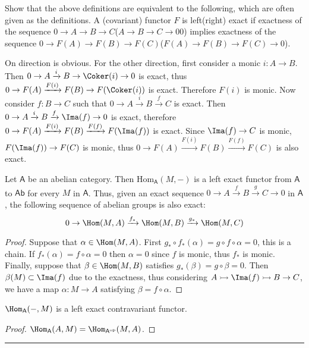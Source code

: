 \begin{exer} Show that the above definitions are equivalent to the following, which are often given as the definitions. A (covariant) functor $F$ is left(right) exact if exactness of the sequence $0\rightarrow A\rightarrow B\rightarrow C$($A\rightarrow B\rightarrow C\rightarrow0 0$) implies exactness of the sequence $0\rightarrow F(A)\rightarrow F(B)\rightarrow F(C)$($F(A)\rightarrow F(B)\rightarrow F(C)\rightarrow 0$).
\end{exer}
\begin{solution} On direction is obvious. For the other direction, first consider a monic $i:A\rightarrow B$. Then $0\rightarrow A\xrightarrow{i} B\rightarrow \Coker(i)\rightarrow 0$ is exact, thus $0\rightarrow F(A)\xrightarrow{F(i)} F(B)\rightarrow F(\Coker(i))$ is exact. Therefore $F(i)$ is monic. Now consider $f:B\rightarrow C$ such that $0\rightarrow A\xrightarrow{i} B\xrightarrow{f} C$ is exact. Then $0\rightarrow A\xrightarrow{i} B\xrightarrow{f} \Ima(f)\rightarrow 0$ is exact, therefore $0\rightarrow F(A)\xrightarrow{F(i)} F(B)\xrightarrow{F(f)} F(\Ima(f))$ is exact. Since $\Ima(f)\rightarrow C$ is monic, $F(\Ima(f))\rightarrow F(C)$ is monic, thus $0\rightarrow F(A)\xrightarrow{F(i)} F(B)\xrightarrow{F(f)} F(C)$ is also exact.
\end{solution}

\begin{prop} Let $\mathsf{A}$ be an abelian category. Then $\textrm{Hom}_{\mathsf{A}}(M,-)$ is a left exact functor from $\mathsf{A}$ to $\mathsf{Ab}$ for every $M$ in $\mathsf{A}$. Thus, given an exact sequence $0\rightarrow A\xrightarrow{f} B\xrightarrow{g} C\rightarrow 0$ in $\mathsf{A}$, the following sequence of abelian groups is also exact:
\begin{equation}
0\rightarrow \Hom(M,A)\xrightarrow{f_*} \Hom(M,B)\xrightarrow{g_*} \Hom(M,C)
\end{equation}
\end{prop}
\begin{proof}
Suppose that $\alpha\in \Hom(M,A)$. First $g_*\circ f_*(\alpha)=g\circ f\circ \alpha=0$, this is a chain. If $f_*(\alpha)=f\circ \alpha=0$ then $\alpha=0$ since $f$ is monic, thus $f_*$ is monic. Finally, suppose that $\beta\in \Hom(M,B)$ satisfies $g_*(\beta)=g\circ \beta=0$. Then $\beta(M)\subset \Ima(f)$ due to the exactness, thus considering $A\rightarrowtail \Ima(f)\rightarrowtail B\rightarrow C$, we have a map $\alpha:M\rightarrow A$ satisfying $\beta=f\circ \alpha$.
\end{proof}

\begin{cor} $\Hom_{\mathsf{A}}(-,M)$ is a left exact contravariant functor.
\end{cor}
\begin{proof}
$\Hom_{\mathsf{A}}(A,M)=\Hom_{\mathsf{A}^{\textrm{op}}}(M,A)$.
\end{proof}
\noindent\rule{\textwidth}{1pt}
\newline